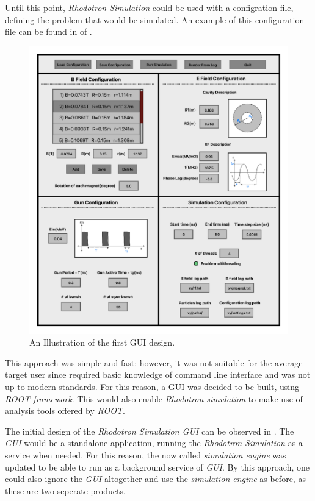 \documentclass{book}
\begin{document}
Until this point, \textit{Rhodotron Simulation} could be used with a configration file, defining the problem that would be simulated.
An example of this configuration file can be found in  of . 
\vspace{10pt}
\begin{figure}[H]
    \centering
    \includegraphics[width=\linewidth]{../../../figures/illustrations/RhodoSim_GUI_Draft_V02.pdf}
    \caption{An Illustration of the first GUI design.}
    \label{fig:gui_illustration}
\end{figure}
\clearpage
This approach was simple and fast; however, it was not suitable for the average target user since required basic knowledge of command line interface and was not up to modern standards.
For this reason, a GUI was decided to be built, using \textit{ROOT framework}. 
This would also enable \textit{Rhodotron simulation} to make use of analysis tools offered by \textit{ROOT}.

The initial design of the \textit{Rhodotron Simulation GUI} can be observed in .
The \textit{GUI} would be a standalone application, running the \textit{Rhodotron Simulation} as a service when needed. 
For this reason, the now called \textit{simulation engine} was updated to be able to run as a background service of \textit{GUI}.
By this approach, one could also ignore the \textit{GUI} altogether and use the \textit{simulation engine} as before, as these are two seperate products.
\end{document}
